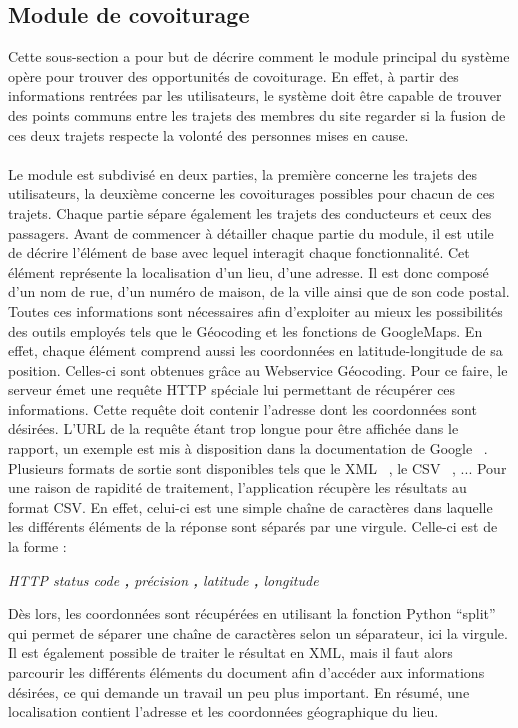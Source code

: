 \documentclass[12pt, a4paper, oneside]{article}
\begin{document}
\subsection{Module de covoiturage} \label{covoiturage}
    Cette sous-section a pour but de décrire comment le module principal du système opère pour trouver des opportunités de covoiturage. En effet, à partir des informations rentrées par les utilisateurs, le système doit être capable de trouver des points communs entre les trajets des membres du site regarder si la fusion de ces deux trajets respecte la volonté des personnes mises en cause.\\\\
    \indent Le module est subdivisé en deux parties, la première concerne les trajets des utilisateurs, la deuxième concerne les covoiturages possibles pour chacun de ces trajets. Chaque partie sépare également les trajets des conducteurs et ceux des passagers. Avant de commencer à détailler chaque partie du module, il est utile de décrire l'élément de base avec lequel interagit chaque fonctionnalité. Cet élément représente la localisation d'un lieu, d'une adresse. Il est donc composé d'un nom de rue, d'un numéro de maison, de la ville ainsi que de son code postal. Toutes ces informations sont nécessaires afin d'exploiter au mieux les possibilités des outils employés tels que le Géocoding et les fonctions de GoogleMaps. En effet, chaque élément comprend aussi les coordonnées en latitude-longitude de sa position. Celles-ci sont obtenues grâce au Webservice Géocoding. Pour ce faire, le serveur émet une requête HTTP spéciale lui permettant de récupérer ces informations. Cette requête doit contenir l'adresse dont les coordonnées sont désirées. L'URL de la requête étant trop longue pour être affichée dans le rapport, un exemple est mis à disposition dans la documentation de Google ~\cite{google-geodoc}. Plusieurs formats de sortie sont disponibles tels que le XML ~\cite{XML}, le CSV ~\cite{CSV}, ... Pour une raison de rapidité de traitement, l'application récupère les résultats au format CSV. En effet, celui-ci est une simple chaîne de caractères dans laquelle les différents éléments de la réponse sont séparés par une virgule. Celle-ci est de la forme :
    \begin{center}
        \textit{HTTP status code \textbf{,} précision \textbf{,} latitude \textbf{,} longitude}
    \end{center}
    Dès lors, les coordonnées sont récupérées en utilisant la fonction Python ``split'' ~\cite{python-split} qui permet de séparer une chaîne de caractères selon un séparateur, ici la virgule. Il est également possible de traiter le résultat en XML, mais il faut alors parcourir les différents éléments du document afin d'accéder aux informations désirées, ce qui demande un travail un peu plus important. En résumé, une localisation contient l'adresse et les coordonnées géographique du lieu.\\\\
\end{document}
